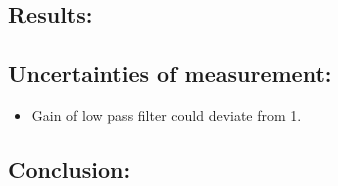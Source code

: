 


\subsection*{Results:}




%

\subsection*{Uncertainties of measurement:}
\begin{itemize}
\item Gain of low pass filter could deviate from 1.
\end{itemize}

\subsection*{Conclusion:}

